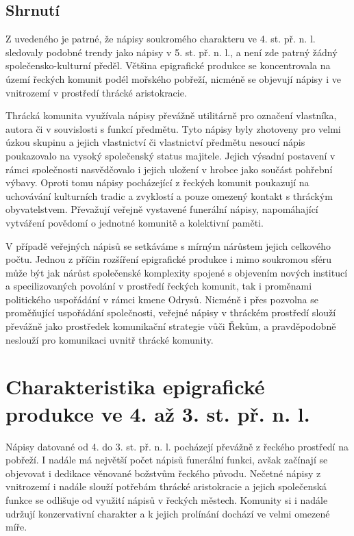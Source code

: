 \subsection[shrnutí-7]{Shrnutí}

Z uvedeného je patrné, že nápisy soukromého charakteru ve 4. st. př. n. l. sledovaly podobné trendy jako nápisy v 5. st. př. n. l., a není zde patrný žádný společensko-kulturní předěl. Většina epigrafické produkce se koncentrovala na území řeckých komunit podél mořského pobřeží, nicméně se objevují nápisy i ve vnitrozemí v prostředí thrácké aristokracie.

Thrácká komunita využívala nápisy převážně utilitárně pro označení vlastníka, autora či v souvislosti s funkcí předmětu. Tyto nápisy byly zhotoveny pro velmi úzkou skupinu a jejich vlastnictví či vlastnictví předmětu nesoucí nápis poukazovalo na vysoký společenský status majitele. Jejich výsadní postavení v rámci společnosti nasvědčovalo i jejich uložení v hrobce jako součást pohřební výbavy. Oproti tomu nápisy pocházející z řeckých komunit poukazují na uchovávání kulturních tradic a zvyklostí a pouze omezený kontakt s thráckým obyvatelstvem. Převažují veřejně vystavené funerální nápisy, napomáhající vytváření povědomí o jednotné komunitě a kolektivní paměti.

V případě veřejných nápisů se setkáváme s mírným nárůstem jejich celkového počtu. Jednou z příčin rozšíření epigrafické produkce i mimo soukromou sféru může být jak nárůst společenské komplexity spojené s objevením nových institucí a specilizovaných povolání v prostředí řeckých komunit, tak i proměnami politického uspořádání v rámci kmene Odrysů. Nicméně i přes pozvolna se proměňující uspořádání společnosti, veřejné nápisy v thráckém prostředí slouží převážně jako prostředek komunikační strategie vůči Řekům, a pravděpodobně neslouží pro komunikaci uvnitř thrácké komunity.

\section[charakteristika-epigrafické-produkce-ve-4.-až-3.-st.-př.-n.-l.]{Charakteristika epigrafické produkce ve 4. až 3. st. př. n. l.}

Nápisy datované od 4. do 3. st. př. n. l. pocházejí převážně z řeckého prostředí na pobřeží. I nadále má největší počet nápisů funerální funkci, avšak začínají se objevovat i dedikace věnované božstvům řeckého původu. Nečetné nápisy z vnitrozemí i nadále slouží potřebám thrácké aristokracie a jejich společenská funkce se odlišuje od využití nápisů v řeckých městech. Komunity si i nadále udržují konzervativní charakter a k jejich prolínání dochází ve velmi omezené míře.


